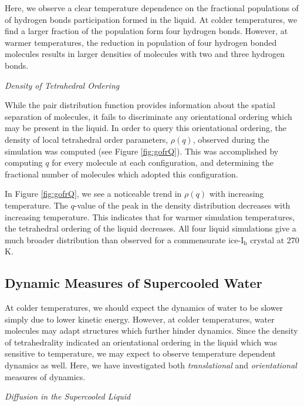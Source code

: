 Here, we observe a clear temperature dependence on the fractional
populations of of hydrogen bonds participation formed in the
liquid. At colder temperatures, we find a larger fraction of the
population form four hydrogen bonds. However, at warmer temperatures,
the reduction in population of four hydrogen bonded molecules results
in larger densities of molecules with two and three hydrogen bonds.


\vspace{0.6cm}
\begin{flushleft}
\textit{Density of Tetrahedral Ordering}
\end{flushleft}

While the pair distribution function provides information about
the spatial separation of molecules, it fails to discriminate any
orientational ordering which may be present in the liquid. In order to
query this orientational ordering, the density of local tetrahedral
order parameters, $\rho (q)$, observed during the simulation was
computed (see Figure \ref{fig:gofrQ}). This was accomplished by
computing $q$ for every molecule at each configuration, and determining
the fractional number of molecules which adopted this configuration.

In Figure \ref{fig:gofrQ}, we see a noticeable trend in $\rho (q)$
with increasing temperature. The $q$-value of the peak in the density
distribution decreases with increasing temperature. This indicates
that for warmer simulation temperatures, the tetrahedral ordering of
the liquid decreases. All four liquid simulations give a much broader
distribution than observed for a commensurate ice-I$_\mathrm{h}$
crystal at 270 K.





\subsection{Dynamic Measures of Supercooled Water}
At colder temperatures, we should expect the dynamics of water to be
slower simply due to lower kinetic energy. However, at colder
temperatures, water molecules may adapt structures which further hinder
dynamics. Since the density of tetrahedrality indicated an
orientational ordering in the liquid which was sensitive to
temperature, we may expect to observe temperature dependent dynamics
as well. Here, we have investigated both \textit{translational} and
\textit{orientational} measures of dynamics.

\vspace{0.6cm}
\begin{flushleft}
\textit{Diffusion in the Supercooled Liquid}
\end{flushleft}

